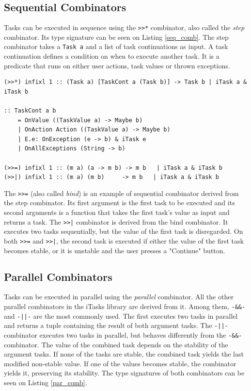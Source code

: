 \subsection{Sequential Combinators}

Tasks can be executed in sequence using the \texttt{>>*} combinator, also called the \textit{step} combinator. Its type signature can be seen on Listing \ref{seq_comb}. The step combinator takes a \texttt{Task a} and a list of task continuations as input. A task continuation defines a condition on when to execute another task. It is a predicate that runs on either user actions, task values or thrown exceptions.

\begin{lstlisting}[caption=Sequential combinators,label=seq_comb,captionpos=b]
(>>*) infixl 1 :: (Task a) [TaskCont a (Task b)] -> Task b | iTask a & iTask b

:: TaskCont a b                               
	= OnValue ((TaskValue a) -> Maybe b)         
	| OnAction Action ((TaskValue a) -> Maybe b) 
	| E.e: OnException (e -> b) & iTask e        
	| OnAllExceptions (String -> b)

(>>=) infixl 1 :: (m a) (a -> m b) -> m b   | iTask a & iTask b
(>>|) infixl 1 :: (m a) (m b)     -> m b   | iTask a & iTask b
\end{lstlisting}

The \texttt{>>=} (also called \textit{bind}) is an example of sequential combinator derived from the step combinator. Its first argument is the first task to be executed and its second arguments is a function that takes the first task's value as input and returns a task. The \texttt{>>|} combinator is derived from the bind combinator. It executes two tasks sequentially, but the value of the first task is disregarded. On both \texttt{>>=} and \texttt{>>|}, the second task is executed if either the value of the first task becomes stable, or it is unstable and the user presses a "Continue" button.

\subsection{Parallel Combinators}

Tasks can be executed in parallel using the \textit{parallel} combinator. All the other parallel combinators in the \gls{iTasks} library are derived from it. Among them, \texttt{-\&\&-} and  \texttt{-||-} are the most commonly used. The first executes two tasks in parallel and returns a tuple containing the result of both argument tasks. The \texttt{-||-} combinator executes two tasks in parallel, but behaves differently from the \texttt{-\&\&-} combinator. The value of the combined task depends on the stability of the argument tasks. If none of the tasks are stable, the combined task yields the last modified non-stable value. If one of the values becomes stable, the combinator yields it, preserving its stability. The type signatures of both combinators can be seen on Listing \ref{par_comb}.

